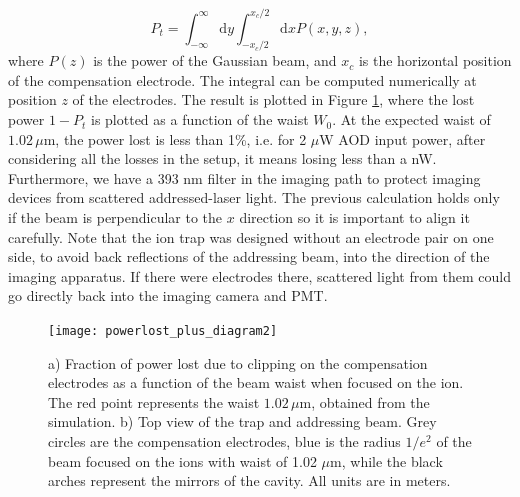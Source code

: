 \begin{equation}
P_{t} = \int_{-\infty}^{\infty}\text{d}y \int_{-x_c/2}^{x_c/2}\text{d}x P(x,y,z),
\end{equation}
where $P(z)$ is the power of the Gaussian beam, and $x_c$ is the horizontal position of the compensation electrode. The integral can be computed numerically at position $z$ of the electrodes. The result is plotted in Figure \ref{lossesplot}, where the lost power $1-P_{t}$ is plotted as a function of the waist $W_0$. At the expected waist of $1.02\,\mu$m, the power lost is less than 1\%, i.e. for 2 $\mu$W AOD input power, after considering all the losses in the setup, it means losing less than a nW. Furthermore, we have a 393 nm filter in the imaging path to protect imaging devices from scattered addressed-laser light. The previous calculation holds only if the beam is perpendicular to the $x$ direction so it is important to align it carefully. Note that the ion trap was designed without an electrode pair on one side, to avoid back reflections of the addressing beam, into the direction of the imaging apparatus. If there were electrodes there, scattered light from them could go directly back into the imaging camera and PMT.\par
\begin{figure}
       \centering
         \texttt{[image: powerlost\_plus\_diagram2]}
         \caption{a) Fraction of power lost due to clipping on the compensation electrodes as a function of the beam waist when focused on the ion. The red point represents the waist $1.02\,\mu$m, obtained from the simulation. b) Top view of the trap and addressing beam. Grey circles are the compensation electrodes, blue is the radius $1/e^2$ of the beam focused on the ions with waist of 1.02 $\mu$m, while the black arches represent the mirrors of the cavity. All units are in meters.}
         \label{lossesplot}
 \end{figure}
